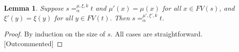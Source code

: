 \documentclass{lmcs}
\theoremstyle{theorem}\newtheorem{theorem}{Theorem}
\theoremstyle{theorem}\newtheorem{lemma}[theorem]{Lemma}
\theoremstyle{theorem}\newtheorem{corollary}[theorem]{Corollary}
\theoremstyle{definition}\newtheorem{definition}[theorem]{Definition}
\theoremstyle{definition}\newtheorem{example}[theorem]{Example}
\newcommand{\Vfree}{\mathcal{V}_{\mathit{nonb}}}
\newcommand{\Vbound}{\mathcal{V}_{\mathit{binder}}}
\newcommand{\FV}{\mathit{FV}}
\newcommand{\identifier}[1]{\mathtt{#1}}
\newcommand{\afun}{\identifier{f}}
\newcommand{\avar}{x}
\newcommand{\bvar}{y}
\newcommand{\ameta}{F}
\newcommand{\abs}[2]{\lambda #1.#2}
\newcommand{\meta}[2]{#1\langle#2\rangle}
\newcommand{\tuple}[2]{\llparenthesis #1,\dots,#2 \rrparenthesis}
\begin{document}
\begin{lemma}\label{lem:alphaunusedvar}
Suppose $s =_\alpha^{\mu,\xi,k} t$ and $\mu'(x) = \mu(x)$ for all $x \in \FV(s)$, and $\xi'(y) = \xi(y)$ for all $y \in \FV(t)$.
Then $s =_\alpha^{\mu',\xi',k} t$.
\end{lemma}

\begin{proof}
By induction on the size of $s$.
All cases are straightforward. [Outcommented]
\end{proof}
\end{document}

